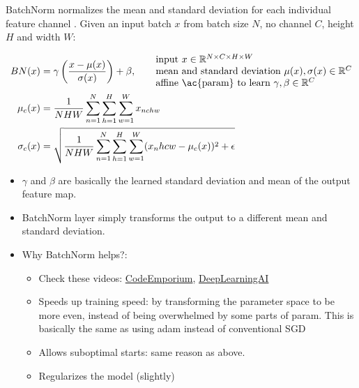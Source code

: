\ac{BatchNorm} normalizes the mean and standard deviation for each individual feature channel \cite{ioffe2015batch}. Given an input batch $x$ from batch size $N$, \ac{no} channel $C$, height $H$ and width $W$:

\begin{align}
	BN(x) &= \gamma \left(\frac{x - \mu(x)}{\sigma(x)}\right) + \beta, \qquad \begin{matrix*}[l]
		\text{input}\ x \in \mathbb{R}^{N \times C \times H \times W}\\
		\text{mean and standard deviation}\ \mu(x), \sigma(x) \in \mathbb{R}^C\\
		\text{affine \ac{param} to learn}\ \gamma, \beta \in \mathbb{R}^C\\
	\end{matrix*}\\
	\mu_c(x) &= \frac{1}{NHW} \sum_{n=1}^{N} \sum_{h=1}^{H} \sum_{w=1}^{W} x_{nchw}\\
	\sigma_c(x)	&= \sqrt{\frac{1}{NHW} \sum_{n=1}^{N} \sum_{h=1}^{H} \sum_{w=1}^{W} (x_nhcw - \mu_c(x))^2 + \epsilon} \label{eq:batch-norm}
\end{align}

\begin{itemize}
	\item $\gamma$ and $\beta$ are basically the learned standard deviation and mean of the output feature map.
	\item \ac{BatchNorm} layer simply transforms the output to a different mean and standard deviation.
	\item Why \ac{BatchNorm} helps?:
	\begin{itemize}
		\item Check these videos: \href{https://youtu.be/DtEq44FTPM4}{CodeEmporium}, \href{https://youtu.be/nUUqwaxLnWs}{DeepLearningAI}
		\item Speeds up training speed: by transforming the parameter space to be more even, instead of being overwhelmed by some parts of \ac{param}. This is basically the same as using \ac{adam} instead of conventional \ac{SGD}
		\item Allows suboptimal starts: same reason as above.
		\item Regularizes the model (slightly)
	\end{itemize}
\end{itemize}

